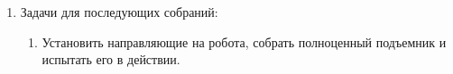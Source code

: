 \begin{enumerate}
\begin{enumerate}
    \end{enumerate}
    \newpage
    
	\item Задачи для последующих собраний:
	\begin{enumerate}
	  \item Установить направляющие на робота, собрать полноценный подъемник и испытать его в действии.
	  
    \end{enumerate}     
\end{enumerate}
\fillpage
